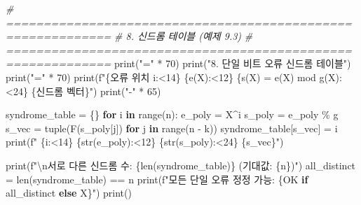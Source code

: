 \documentclass[
  oneside]{article}
\newenvironment{Shaded}{}{}
\newcommand{\BuiltInTok}[1]{\textcolor[rgb]{0.00,0.50,0.00}{#1}}
\newcommand{\CharTok}[1]{\textcolor[rgb]{0.25,0.44,0.63}{#1}}
\newcommand{\CommentTok}[1]{\textcolor[rgb]{0.38,0.63,0.69}{\textit{#1}}}
\newcommand{\ControlFlowTok}[1]{\textcolor[rgb]{0.00,0.44,0.13}{\textbf{#1}}}
\newcommand{\DecValTok}[1]{\textcolor[rgb]{0.25,0.63,0.44}{#1}}
\newcommand{\KeywordTok}[1]{\textcolor[rgb]{0.00,0.44,0.13}{\textbf{#1}}}
\newcommand{\NormalTok}[1]{#1}
\newcommand{\OperatorTok}[1]{\textcolor[rgb]{0.40,0.40,0.40}{#1}}
\newcommand{\SpecialCharTok}[1]{\textcolor[rgb]{0.25,0.44,0.63}{#1}}
\newcommand{\SpecialStringTok}[1]{\textcolor[rgb]{0.73,0.40,0.53}{#1}}
\newcommand{\StringTok}[1]{\textcolor[rgb]{0.25,0.44,0.63}{#1}}
\begin{document}
\begin{Shaded}
\begin{Highlighting}[]
\CommentTok{\# ============================================================}
\CommentTok{\# 8. 신드롬 테이블 (예제 9.3)}
\CommentTok{\# ============================================================}
\BuiltInTok{print}\NormalTok{(}\StringTok{"="} \OperatorTok{*} \DecValTok{70}\NormalTok{)}
\BuiltInTok{print}\NormalTok{(}\StringTok{"8. 단일 비트 오류 신드롬 테이블"}\NormalTok{)}
\BuiltInTok{print}\NormalTok{(}\StringTok{"="} \OperatorTok{*} \DecValTok{70}\NormalTok{)}
\BuiltInTok{print}\NormalTok{(}\SpecialStringTok{f"}\SpecialCharTok{\{}\StringTok{\textquotesingle{}오류 위치 i\textquotesingle{}}\SpecialCharTok{:\textless{}14\}}\SpecialStringTok{ }\SpecialCharTok{\{}\StringTok{\textquotesingle{}e(X)\textquotesingle{}}\SpecialCharTok{:\textless{}12\}}\SpecialStringTok{ }\SpecialCharTok{\{}\StringTok{\textquotesingle{}s(X) = e(X) mod g(X)\textquotesingle{}}\SpecialCharTok{:\textless{}24\}}\SpecialStringTok{ }\SpecialCharTok{\{}\StringTok{\textquotesingle{}신드롬 벡터\textquotesingle{}}\SpecialCharTok{\}}\SpecialStringTok{"}\NormalTok{)}
\BuiltInTok{print}\NormalTok{(}\StringTok{"{-}"} \OperatorTok{*} \DecValTok{65}\NormalTok{)}

\NormalTok{syndrome\_table }\OperatorTok{=}\NormalTok{ \{\}}
\ControlFlowTok{for}\NormalTok{ i }\KeywordTok{in} \BuiltInTok{range}\NormalTok{(n):}
\NormalTok{    e\_poly }\OperatorTok{=}\NormalTok{ X}\OperatorTok{\^{}}\NormalTok{i}
\NormalTok{    s\_poly }\OperatorTok{=}\NormalTok{ e\_poly }\OperatorTok{\%}\NormalTok{ g}
\NormalTok{    s\_vec }\OperatorTok{=} \BuiltInTok{tuple}\NormalTok{(F(s\_poly[j]) }\ControlFlowTok{for}\NormalTok{ j }\KeywordTok{in} \BuiltInTok{range}\NormalTok{(n }\OperatorTok{{-}}\NormalTok{ k))}
\NormalTok{    syndrome\_table[s\_vec] }\OperatorTok{=}\NormalTok{ i}
    \BuiltInTok{print}\NormalTok{(}\SpecialStringTok{f"  }\SpecialCharTok{\{}\NormalTok{i}\SpecialCharTok{:\textless{}14\}}\SpecialStringTok{ }\SpecialCharTok{\{}\BuiltInTok{str}\NormalTok{(e\_poly)}\SpecialCharTok{:\textless{}12\}}\SpecialStringTok{ }\SpecialCharTok{\{}\BuiltInTok{str}\NormalTok{(s\_poly)}\SpecialCharTok{:\textless{}24\}}\SpecialStringTok{ }\SpecialCharTok{\{}\NormalTok{s\_vec}\SpecialCharTok{\}}\SpecialStringTok{"}\NormalTok{)}

\BuiltInTok{print}\NormalTok{(}\SpecialStringTok{f"}\CharTok{\textbackslash{}n}\SpecialStringTok{서로 다른 신드롬 수: }\SpecialCharTok{\{}\BuiltInTok{len}\NormalTok{(syndrome\_table)}\SpecialCharTok{\}}\SpecialStringTok{ (기대값: }\SpecialCharTok{\{}\NormalTok{n}\SpecialCharTok{\}}\SpecialStringTok{)"}\NormalTok{)}
\NormalTok{all\_distinct }\OperatorTok{=} \BuiltInTok{len}\NormalTok{(syndrome\_table) }\OperatorTok{==}\NormalTok{ n}
\BuiltInTok{print}\NormalTok{(}\SpecialStringTok{f"모든 단일 오류 정정 가능: }\SpecialCharTok{\{}\StringTok{\textquotesingle{}OK\textquotesingle{}} \ControlFlowTok{if}\NormalTok{ all\_distinct }\ControlFlowTok{else} \StringTok{\textquotesingle{}X\textquotesingle{}}\SpecialCharTok{\}}\SpecialStringTok{"}\NormalTok{)}
\BuiltInTok{print}\NormalTok{()}


\end{Highlighting}
\end{Shaded}
\end{document}
